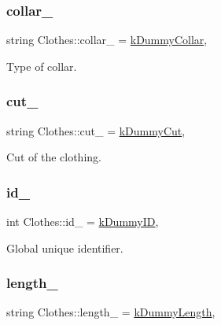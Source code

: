 \subsubsection{\texorpdfstring{collar\+\_\+}{collar\_}}
{\footnotesize\ttfamily string Clothes\+::collar\+\_\+ = \mbox{\hyperlink{clothes_8h_ac06c9f556f68bcd2829e36c55b70a86e}{k\+Dummy\+Collar}}\hspace{0.3cm}{\ttfamily [protected]}, {\ttfamily [inherited]}}



Type of collar. 

\mbox{\label{classClothes_ac1c2286c8928a5eee91d818a098a44ac}} 
\subsubsection{\texorpdfstring{cut\+\_\+}{cut\_}}
{\footnotesize\ttfamily string Clothes\+::cut\+\_\+ = \mbox{\hyperlink{clothes_8h_a8a6eb066049b009439505355aeaae375}{k\+Dummy\+Cut}}\hspace{0.3cm}{\ttfamily [protected]}, {\ttfamily [inherited]}}



Cut of the clothing. 

\mbox{\label{classClothes_a8978d931db5ca47c3ccea30def4ae83e}} 
\subsubsection{\texorpdfstring{id\+\_\+}{id\_}}
{\footnotesize\ttfamily int Clothes\+::id\+\_\+ = \mbox{\hyperlink{clothes_8h_a77186917343a417a2369cdff0bc86d31}{k\+Dummy\+ID}}\hspace{0.3cm}{\ttfamily [protected]}, {\ttfamily [inherited]}}



Global unique identifier. 

\mbox{\label{classClothes_ae02603eda727e33caf46ec30e761e3c3}} 
\subsubsection{\texorpdfstring{length\+\_\+}{length\_}}
{\footnotesize\ttfamily string Clothes\+::length\+\_\+ = \mbox{\hyperlink{clothes_8h_a1624256dcecfb0995a74c36142593770}{k\+Dummy\+Length}}\hspace{0.3cm}{\ttfamily [protected]}, {\ttfamily [inherited]}}



